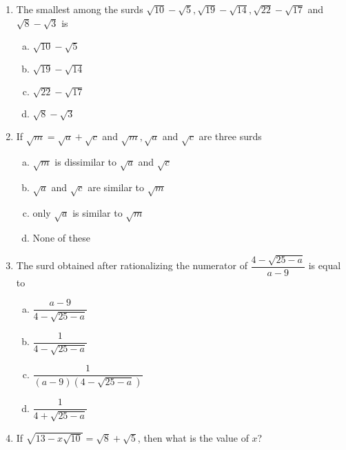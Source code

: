 \begin{multicols}{2}
\begin{enumerate}
\begin{multicols}{2}
\begin{enumerate}[(a)]
\item 2
\item 5
\item 1
\item 11
\end{enumerate}
\end{multicols}
\item The smallest among the surds $\sqrt{10}-\sqrt{5},\sqrt{19}-\sqrt{14},\sqrt{22}-\sqrt{17}$ and $\sqrt{8}-\sqrt{3}$ is
\begin{multicols}{2}
\begin{enumerate}[(a)]
\item $\sqrt{10}-\sqrt{5}$
\item $\sqrt{19}-\sqrt{14}$
\item $\sqrt{22}-\sqrt{17}$
\item $\sqrt{8}-\sqrt{3}$
\end{enumerate}
\end{multicols}
\item If $\sqrt{m} = \sqrt{a}+\sqrt{c}$ and $\sqrt{m}, \sqrt{a}$ and $\sqrt{c}$ are three surds
\begin{enumerate}[(a)]
\item $\sqrt{m}$ is dissimilar to $\sqrt{a}$ and $\sqrt{c}$
\item $\sqrt{a}$ and $\sqrt{c}$  are similar to $\sqrt{m}$
\item only $\sqrt{a}$ is similar to $\sqrt{m}$
\item None of these
\end{enumerate}
\item The surd obtained after rationalizing the numerator of $\dfrac{4-\sqrt{25-a}}{a-9}$ is equal to
\begin{enumerate}[(a)]
\item $\dfrac{a-9}{4-\sqrt{25-a}}$
\item $\dfrac{1}{4-\sqrt{25-a}}$
\item $\dfrac{1}{(a-9)(4-\sqrt{25-a})}$
\item $\dfrac{1}{4+\sqrt{25-a}}$
\end{enumerate}
\item If $\sqrt{13-x\sqrt{10}} = \sqrt{8}+\sqrt{5}$, then what is the value of $x $?
\begin{multicols}{2}
\begin{enumerate}[(a)]

\end{enumerate}
\end{multicols}
\end{enumerate}
\end{multicols}
